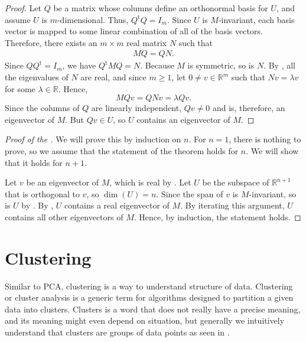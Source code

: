 \documentclass[a4paper, 12pt]{article}
\numberwithin{equation}{section}
\numberwithin{figure}{section}
\theoremstyle{definition}
\renewcommand{\geq}{\geqslant}
\newcommand{\R}{\mathbb{R}}
\newcommand{\tr}{\mathrm{t}}
\begin{document}
\begin{proof}
	Let $Q$ be a matrix whose columns define an orthonormal basis for $U$, and
	assume $U$ is $m$-dimensional. Thus, $Q^{\tr}Q = I_m$. Since $U$ is
	$M$-invariant, each basis vector is mapped to some linear combination of all
	of the basis vectors. Therefore, there exists an $m\times m$ real matrix $N$
	such that 
	\begin{align*}
		MQ = QN. 
	\end{align*}
	Since $QQ^{\tr} = I_m$, we have $Q^{\tr}MQ = N$. Because $M$ is symmetric,
	so is $N$. By , all the eigenvalues of $N$ are real,
	and since $m\geq 1$, let $0\neq v\in\R^m$ such that $Nv=\lambda v$ for some
	$\lambda\in \R$. Hence, 
	\[ 
		MQv = QNv = \lambda Qv.
	\] 
	Since the columns of $Q$ are linearly independent, $Qv\neq 0$ and is,
	therefore, an eigenvector of $M$. But $Qv\in U$, so $U$ contains an
	eigenvector of $M$.
\end{proof}

\begin{proof}[Proof of the ]
	We will prove this by induction on $n$. For $n=1$, there is nothing to
	prove, so we assume that the statement of the theorem holds for $n$. We will
	show that it holds for $n+1$.

	Let $v$ be an eigenvector of $M$, which is real by .
	Let $U$ be the subspace of $\R^{n+1}$ that is orthogonal to $v$, so $\dim(U)
	= n$. Since the span of $v$ is $M$-invariant, so is $U$ by
	. By , $U$ contains a real
	eigenvector of $M$. By iterating this argument, $U$ contains all other
	eigenvectors of $M$. Hence, by induction, the statement holds. 
\end{proof}


\section{Clustering}

Similar to PCA, clustering is a way to understand structure of data. Clustering
or cluster analysis is a generic term for algorithms designed to partition a
given data into clusters. Clusters is a word that does not really have a precise
meaning, and its meaning might even depend on situation, but generally we
intuitively understand that clusters are groups of data points as seen in
.
\end{document}
